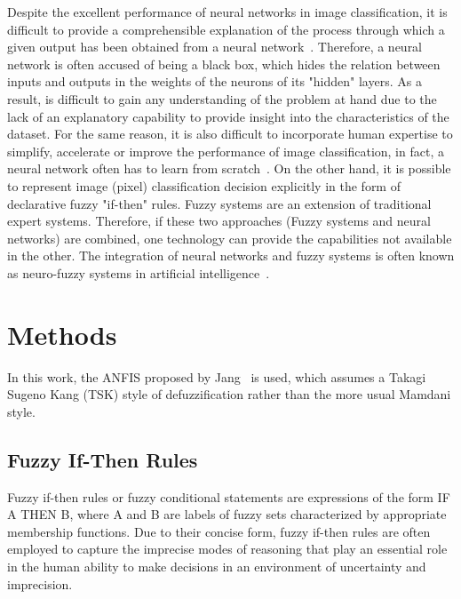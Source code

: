 \documentclass[10pt,twocolumn,letterpaper]{article}
\begin{document}
Despite the excellent performance of neural networks in image classification, it is difficult to provide a comprehensible explanation of the process through which a given output has been obtained from a neural network~\cite{critique}. Therefore, a neural network is often accused of being a black box, which hides the relation between inputs and outputs in the weights of the neurons of its "hidden" layers. As a result, is difficult to gain any understanding of the problem at hand due to the lack of an explanatory capability to provide insight into the characteristics of the dataset. For the same reason, it is also difficult to incorporate human expertise to simplify, accelerate or improve the performance of image classification, in fact, a neural network often has to learn from scratch~\cite{dataManual}.
On the other hand, it is possible to represent image (pixel) classification decision explicitly in the form of declarative fuzzy "if-then" rules. Fuzzy systems are an extension of traditional expert systems.
Therefore, if these two approaches (Fuzzy systems and neural networks) are combined, one technology can provide the capabilities not available in the other. The integration of neural networks and fuzzy systems is often known as neuro-fuzzy systems in artificial intelligence~\cite{dataManual}.

\section{Methods}

In this work, the ANFIS proposed by Jang~\cite{jang} is used, which assumes a Takagi Sugeno Kang (TSK) style of defuzzification rather than the more usual Mamdani style.

\subsection{Fuzzy If-Then Rules}

Fuzzy  if-then rules or fuzzy conditional statements are expressions of the form IF A THEN B, where A and B are labels of fuzzy sets characterized by appropriate  membership functions. Due  to their  concise  form, fuzzy if-then rules are often employed to capture the imprecise modes of reasoning that play an essential role in the human ability to  make decisions in an environment of uncertainty and imprecision.~\cite{jang} 
\end{document}
